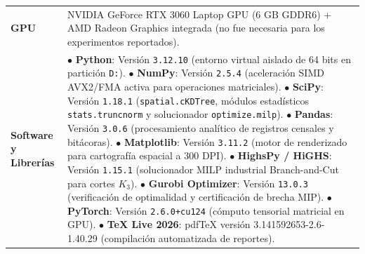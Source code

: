 \documentclass[11pt,a4paper]{article}
\begin{document}
\begin{table}[H]
\begin{tabularx}{\textwidth}{lX}
\addlinespace
\textbf{GPU} & NVIDIA GeForce RTX 3060 Laptop GPU ($6\text{ GB}$ GDDR6) + AMD Radeon Graphics integrada (no fue necesaria para los experimentos reportados). \\
\addlinespace
\textbf{Software y Librerías} & $\bullet$ \textbf{Python}: Versión \texttt{3.12.10} (entorno virtual aislado de 64 bits en partición \texttt{D:}). \newline
$\bullet$ \textbf{NumPy}: Versión \texttt{2.5.4} (aceleración SIMD AVX2/FMA activa para operaciones matriciales). \newline
$\bullet$ \textbf{SciPy}: Versión \texttt{1.18.1} (\texttt{spatial.cKDTree}, módulos estadísticos \texttt{stats.truncnorm} y solucionador \texttt{optimize.milp}). \newline
$\bullet$ \textbf{Pandas}: Versión \texttt{3.0.6} (procesamiento analítico de registros censales y bitácoras). \newline
$\bullet$ \textbf{Matplotlib}: Versión \texttt{3.11.2} (motor de renderizado para cartografía espacial a 300 DPI). \newline
$\bullet$ \textbf{HighsPy / HiGHS}: Versión \texttt{1.15.1} (solucionador MILP industrial Branch-and-Cut para cortes $K_3$). \newline
$\bullet$ \textbf{Gurobi Optimizer}: Versión \texttt{13.0.3} (verificación de optimalidad y certificación de brecha MIP). \newline
$\bullet$ \textbf{PyTorch}: Versión \texttt{2.6.0+cu124} (cómputo tensorial matricial en GPU). \newline
$\bullet$ \textbf{TeX Live 2026}: pdfTeX versión 3.141592653-2.6-1.40.29 (compilación automatizada de reportes). \\
\bottomrule
\end{tabularx}
\end{table}
\end{document}
